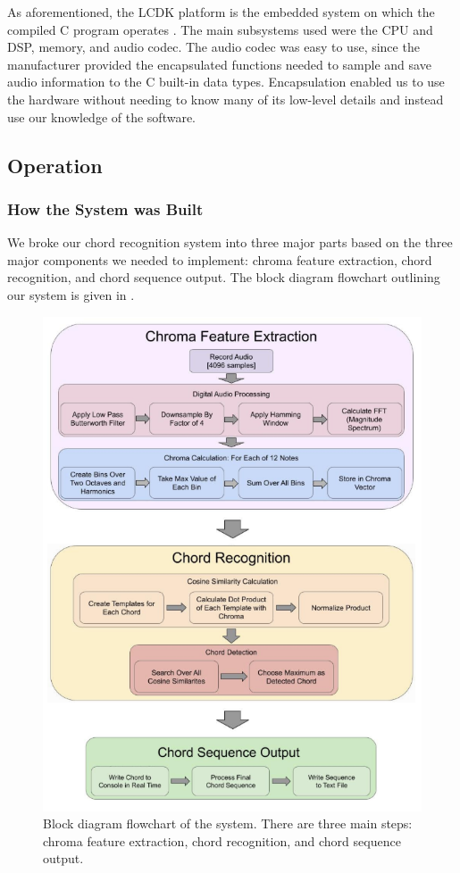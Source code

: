 \documentclass[journal]{IEEEtran}
\begin{document}
As aforementioned, the LCDK platform is the embedded system on which the compiled C program operates \cite{lcdk}.
The main subsystems used were the CPU and DSP, memory, and audio codec.
The audio codec was easy to use, since the manufacturer provided the encapsulated functions needed to sample and save audio information to the C built-in data types.
Encapsulation enabled us to use the hardware without needing to know many of its low-level details and instead use our knowledge of the software.


\subsection{Operation}


\subsubsection{How the System was Built}
We broke our chord recognition system into three major parts based on the three major components we needed to implement: chroma feature extraction, chord recognition, and chord sequence output.
The block diagram flowchart outlining our system is given in .
\begin{figure}[!t]
    \centering
    \includegraphics[width = \linewidth]{../Figures/block_diagram_2}
    \caption{Block diagram flowchart of the system.
    There are three main steps: chroma feature extraction, chord recognition, and chord sequence output.}
    \label{fig:block}
\end{figure}
\end{document}
